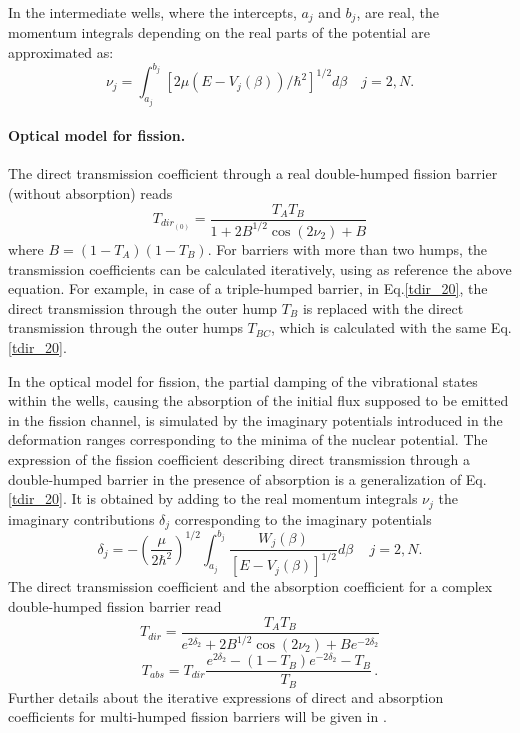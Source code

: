 \documentclass[twocolumn,amsmath,amssymb,10pt,groupedaddress,letter]{revtex4}
\begin{document}
In the intermediate wells, where the intercepts, $a_{j}$ and $b_{j}$, are real,
the momentum integrals depending on the real parts of the potential are
approximated as:
\begin{equation}
\nu_{j}=\int_{a_{j}}^{b_{j}}[2\mu(E-V_{j}(\beta))/\hbar^{2}]^{1/2}d\beta\quad
j=2,N.
\end{equation}

\medskip
\paragraph*{Optical model for fission.}
%
The direct transmission coefficient through a real double-humped fission barrier
(without absorption) reads~\cite{Bhandari:79}
%
\begin{equation}
T_{dir_{(0)}}=\frac{T_{A}T_{B}}{1+2B^{1/2}\cos (2\nu_{2})+B}
\label{tdir_20}%
\end{equation}%
%
where $B=(1-T_{A})(1-T_{B})$. For barriers with more than two humps, the transmission
coefficients can be calculated iteratively, using as reference the above equation.
For example, in case of a triple-humped barrier, in Eq.\ref{tdir_20}, the direct
transmission through the outer hump $T_B$  is replaced with the direct
transmission through the outer humps $T_{BC}$, which is calculated with the same
Eq.\ref{tdir_20}.


In the optical model for fission, the partial damping of the vibrational states
within the wells, causing the absorption of the initial flux supposed to be emitted
in the fission channel, is simulated by the imaginary potentials introduced in the
deformation ranges corresponding to the minima of the nuclear potential.
The expression of the fission coefficient describing direct transmission through a
double-humped barrier in the presence of absorption is a generalization of Eq.\ref{tdir_20}.
It is obtained by adding to the real momentum integrals $\nu_j$ the imaginary contributions
$\delta_j$ corresponding to the imaginary potentials  \cite{Bhandari:79}
%
\begin{equation}
\delta_j=-\left(  \frac{\mu}{2\hbar^{2}}\right)  ^{1/2}\int_{a_{j}}^{b_{j}%
}\frac{W_j(\beta)}{[E-V_{j}(\beta)]^{1/2}}d\beta\,\quad
j=2,N.
\end{equation}
%
The direct transmission coefficient and the absorption coefficient for a complex double-humped
fission barrier read
%
\begin{equation}
T_{dir}=\frac{T_{A}T_{B}}{e^{2\delta_2}+2B^{1/2}\cos
(2\nu_{2})+Be^{-2\delta_2}} \label{tdir_2}%
\end{equation}
%
%
\begin{equation}
T_{abs}=T_{dir}\frac{e^{2\delta_2}-(1-T_{B})e^{-2\delta_2}-T_{B}}{T_{B}}\,.
\label{tabs_2}%
\end{equation}
%
Further details about the iterative expressions of direct and absorption coefficients for
multi-humped fission barriers will be given in \cite{Sin:07}.
\end{document}
